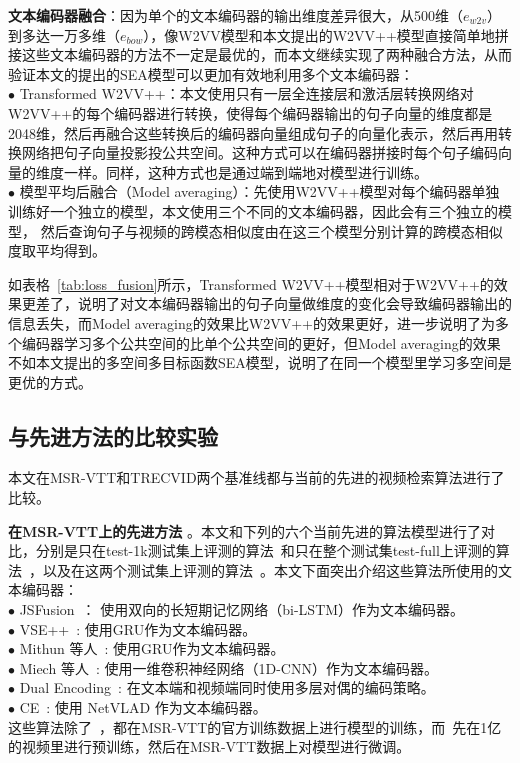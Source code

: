 

\textbf{文本编码器融合}：因为单个的文本编码器的输出维度差异很大，从500维（$e_{w2v}$）到多达一万多维（$e_{bow}$），像W2VV模型和本文提出的W2VV++模型直接简单地拼接这些文本编码器的方法不一定是最优的，而本文继续实现了两种融合方法，从而验证本文的提出的SEA模型可以更加有效地利用多个文本编码器：\\
$\bullet$ Transformed W2VV++：本文使用只有一层全连接层和激活层转换网络对W2VV++的每个编码器进行转换，使得每个编码器输出的句子向量的维度都是2048维，然后再融合这些转换后的编码器向量组成句子的向量化表示，然后再用转换网络把句子向量投影投公共空间。这种方式可以在编码器拼接时每个句子编码向量的维度一样。同样，这种方式也是通过端到端地对模型进行训练。  \\
$\bullet$ 模型平均后融合（Model averaging）：先使用W2VV++模型对每个编码器单独训练好一个独立的模型，本文使用三个不同的文本编码器，因此会有三个独立的模型， 然后查询句子与视频的跨模态相似度由在这三个模型分别计算的跨模态相似度取平均得到。

如表格~\ref{tab:loss_fusion}所示，Transformed W2VV++模型相对于W2VV++的效果更差了，说明了对文本编码器输出的句子向量做维度的变化会导致编码器输出的信息丢失，而Model averaging的效果比W2VV++的效果更好，进一步说明了为多个编码器学习多个公共空间的比单个公共空间的更好，但Model averaging的效果不如本文提出的多空间多目标函数SEA模型，说明了在同一个模型里学习多空间是更优的方式。


\subsection{与先进方法的比较实验}
本文在MSR-VTT和TRECVID两个基准线都与当前的先进的视频检索算法进行了比较。

\textbf{在MSR-VTT上的先进方法} 。本文和下列的六个当前先进的算法模型进行了对比，分别是只在test-1k测试集上评测的算法~\cite{miech2019howto100m,yu2018a}和只在整个测试集test-full上评测的算法~\cite{mithun2018learning}，以及在这两个测试集上评测的算法~\cite{dong2019dual,faghri2017vse++,liu2019use}。本文下面突出介绍这些算法所使用的文本编码器：\\
$\bullet$ JSFusion~\cite{yu2018a}： 使用双向的长短期记忆网络（bi-LSTM）作为文本编码器。 \\
$\bullet$ VSE++~\cite{faghri2017vse++}: 使用GRU作为文本编码器。 \\
$\bullet$ Mithun 等人~\cite{mithun2018learning}: 使用GRU作为文本编码器。 \\
$\bullet$ Miech 等人~\cite{miech2019howto100m}: 使用一维卷积神经网络（1D-CNN）作为文本编码器。 \\
$\bullet$ Dual Encoding~\cite{dong2019dual}: 在文本端和视频端同时使用多层对偶的编码策略。\\
$\bullet$ CE~\cite{liu2019use}: 使用 NetVLAD 作为文本编码器。\\
这些算法除了~\cite{miech2019howto100m}，都在MSR-VTT的官方训练数据上进行模型的训练，而~\cite{miech2019howto100m}先在1亿的视频里进行预训练，然后在MSR-VTT数据上对模型进行微调。

